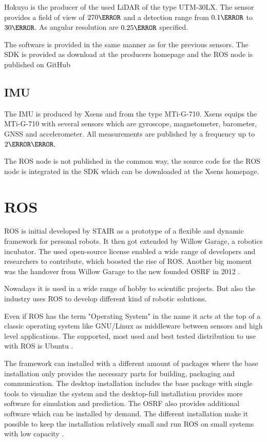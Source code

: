 Hokuyo is the producer of the used \ac{LiDAR} of the type UTM-30LX.
The sensor provides a field of view of $270\degree$ and a detection range from $0.1\meter$ to $30\meter$.
As angular resolution are $0.25\degree$ specified\cite{UTM-30LX}.

The software is provided in the same manner as for the previous sensors.
The \ac{SDK} is provided as download at the producers homepage and the ROS node is published on GitHub\cite{URG_node}

\subsection{IMU}\label{ssec:HWIMU}

The IMU is produced by Xsens and from the type MTi-G-710.
Xsens equips the MTi-G-710 with several sensors which are gyroscope, magnetometer, barometer, GNSS and accelerometer.
All measurements are published by a frequency up to $2\kilo\hertz$\cite{IMU}.

The ROS node is not published in the common way, the source code for the ROS node is integrated in the \ac{SDK} which can be downloaded at the Xsens homepage.

\section{ROS}\label{sec:ros}
\ac{ROS} is initial developed by \ac{STAIR} as a prototype of a flexible and dynamic framework for personal robots.
It then got extended by Willow Garage, a robotics incubator.
The used open-source license enabled a wide range of developers and researchers to contribute, which boosted the rise of \ac{ROS}.
Another big moment was the handover from Willow Garage to the new founded \ac{OSRF} in 2012 \cite{rosHistory}.

Nowadays it is used in a wide range of hobby to scientific projects.
But also the industry uses \ac{ROS} to develop different kind of robotic solutions.

Even if \ac{ROS} has the term "Operating System" in the name it acts at the top of a classic operating system like GNU/Linux as middleware between sensors and high level applications.
The supported, most used and best tested distribution to use with \ac{ROS} is Ubuntu \cite{rosInstallationOS}.

The framework can installed with a different amount of packages where the base installation only provides the necessary parts for building, packaging and communication.
The desktop installation includes the base package with single tools to visualize the system and the desktop-full installation provides more software for simulation and prediction.
The \ac{OSRF} also provides additional software which can be installed by demand.
The different installation make it possible to keep the installation relatively small and run \ac{ROS} on small systems with low capacity \cite{rosInstallations}.

